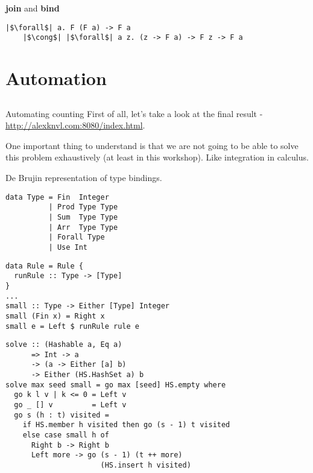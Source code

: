 \documentclass[tikz]{beamer}
\theoremstyle{definition}
\begin{document}
\begin{frame}[fragile]{\textbf{join} and \textbf{bind}}
\begin{verbatim}
|$\forall$| a. F (F a) -> F a
    |$\cong$| |$\forall$| a z. (z -> F a) -> F z -> F a
\end{verbatim}
\end{frame}

\section{Automation}
\subsection{}

\begin{frame}[fragile]{Automating counting}
First of all, let's take a look at the final result - \url{http://alexknvl.com:8080/index.html}.
\end{frame}

\begin{frame}[fragile]
One important thing to understand is that we are not going to be able to solve this problem exhaustively (at least in this workshop). Like integration in calculus.
\end{frame}

\begin{frame}[fragile]
De Brujin representation of type bindings.
\begin{verbatim}
data Type = Fin  Integer
          | Prod Type Type
          | Sum  Type Type
          | Arr  Type Type
          | Forall Type
          | Use Int
\end{verbatim}
\end{frame}

\begin{frame}[fragile]
\begin{verbatim}
data Rule = Rule {
  runRule :: Type -> [Type]
}
...
small :: Type -> Either [Type] Integer
small (Fin x) = Right x
small e = Left $ runRule rule e
\end{verbatim}
\end{frame}
\begin{frame}[fragile]
\begin{verbatim}
solve :: (Hashable a, Eq a)
      => Int -> a
      -> (a -> Either [a] b)
      -> Either (HS.HashSet a) b
solve max seed small = go max [seed] HS.empty where
  go k l v | k <= 0 = Left v
  go _ [] v         = Left v
  go s (h : t) visited =
    if HS.member h visited then go (s - 1) t visited
    else case small h of
      Right b -> Right b
      Left more -> go (s - 1) (t ++ more)
                      (HS.insert h visited)
\end{verbatim}
\end{frame}
\end{document}
